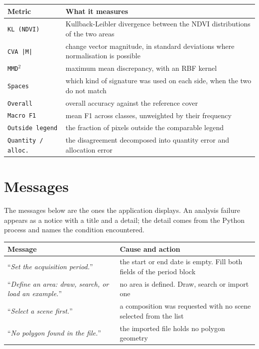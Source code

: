 \documentclass[12pt,a4paper]{article}
\newcommand{\msg}[1]{``\textit{#1}''}
\begin{document}
\begin{center}
\label{tab:domain}
\small
\renewcommand{\arraystretch}{1.18}
\begin{tabular}{@{}L{3.4cm}L{12.2cm}@{}}
\toprule
\textbf{Metric} & \textbf{What it measures} \\
\midrule
\texttt{KL (NDVI)} & Kullback-Leibler divergence between the NDVI distributions of the two areas \\
\texttt{CVA |M|} & change vector magnitude, in standard deviations where normalisation is possible \\
\texttt{MMD$^2$} & maximum mean discrepancy, with an RBF kernel \\
\texttt{Spaces} & which kind of signature was used on each side, when the two do not match \\
\texttt{Overall} & overall accuracy against the reference cover \\
\texttt{Macro F1} & mean F1 across classes, unweighted by their frequency \\
\texttt{Outside legend} & the fraction of pixels outside the comparable legend \\
\texttt{Quantity / alloc.} & the disagreement decomposed into quantity error and allocation error \\
\bottomrule
\end{tabular}
\end{center}

\section{Messages}
\label{ap:messages}

The messages below are the ones the application displays. An analysis failure
appears as a notice with a title and a detail; the detail comes from the Python
process and names the condition encountered.

\begin{center}
\label{tab:refusal}
\small
\renewcommand{\arraystretch}{1.18}
\begin{tabular}{@{}L{7.6cm}L{8.0cm}@{}}
\toprule
\textbf{Message} & \textbf{Cause and action} \\
\midrule
\msg{Set the acquisition period.} & the start or end date is empty. Fill both fields of the period block \\
\msg{Define an area: draw, search, or load an example.} & no area is defined. Draw, search or import one \\
\msg{Select a scene first.} & a composition was requested with no scene selected from the list \\
\msg{No polygon found in the file.} & the imported file holds no polygon geometry \\
\bottomrule
\end{tabular}
\end{center}
\end{document}
